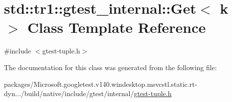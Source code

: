 \hypertarget{classstd_1_1tr1_1_1gtest__internal_1_1_get}{}\section{std\+::tr1\+::gtest\+\_\+internal\+::Get$<$ k $>$ Class Template Reference}
\label{classstd_1_1tr1_1_1gtest__internal_1_1_get}


{\ttfamily \#include $<$gtest-\/tuple.\+h$>$}



The documentation for this class was generated from the following file\+:\begin{DoxyCompactItemize}
\item 
packages/\+Microsoft.\+googletest.\+v140.\+windesktop.\+msvcstl.\+static.\+rt-\/dyn.../build/native/include/gtest/internal/\mbox{\hyperlink{gtest-tuple_8h}{gtest-\/tuple.\+h}}\end{DoxyCompactItemize}
